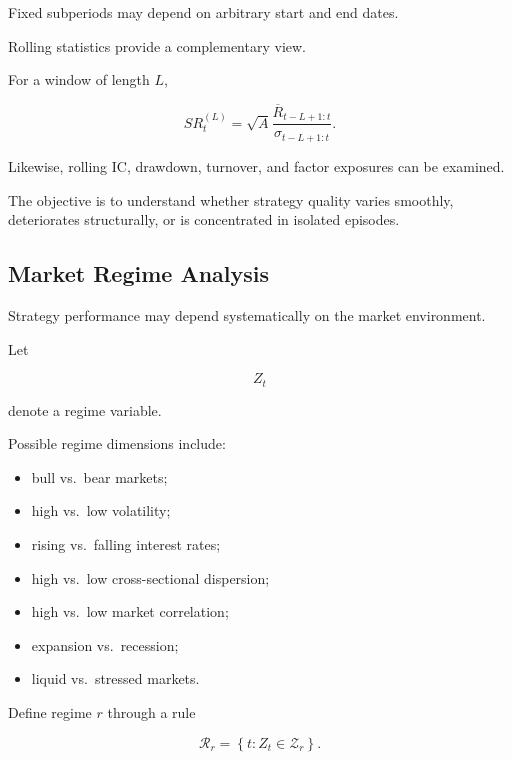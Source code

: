 \documentclass[11pt,a4paper]{article}
\begin{document}
Fixed subperiods may depend on arbitrary start and end dates.

Rolling statistics provide a complementary view.

For a window of length $L$,

\begin{equation}
\boxed{
SR_t^{(L)}
=
\sqrt{A}
\frac{
\overline{R}_{t-L+1:t}
}{
\sigma_{t-L+1:t}
}.
}
\end{equation}

Likewise, rolling IC, drawdown, turnover, and factor exposures can be examined.

The objective is to understand whether strategy quality varies smoothly,
deteriorates structurally, or is concentrated in isolated episodes.


\subsection{Market Regime Analysis}
\label{subsec:market_regime_analysis}

Strategy performance may depend systematically on the market environment.

Let

\begin{equation}
Z_t
\end{equation}

denote a regime variable.

Possible regime dimensions include:

\begin{itemize}
    \item bull vs.\ bear markets;
    \item high vs.\ low volatility;
    \item rising vs.\ falling interest rates;
    \item high vs.\ low cross-sectional dispersion;
    \item high vs.\ low market correlation;
    \item expansion vs.\ recession;
    \item liquid vs.\ stressed markets.
\end{itemize}

Define regime $r$ through a rule

\begin{equation}
\mathcal{R}_r
=
\left\{
t:
Z_t\in\mathcal{Z}_r
\right\}.
\end{equation}
\end{document}
